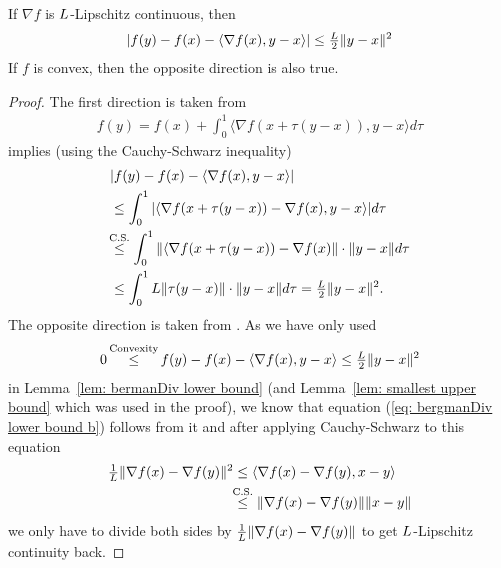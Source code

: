 \begin{lemma}
	\label{Appdx-lem: Lipschitz Gradient implies taylor inequality}
	If \(\nabla f\) is \(L\)-Lipschitz continuous, then
	\begin{align*}
		|f(y) - f(x) - \langle \nabla f(x), y-x\rangle | \le \tfrac{L}2 \|y-x\|^2
	\end{align*}
	If \(f\) is convex, then the opposite direction is also true.
\end{lemma}
\begin{proof}
	The first direction is taken from \textcite[Lemma
	1.2.3]{nesterovLecturesConvexOptimization2018}
 \begin{align*}
		f(y) = f(x) + \int_0^1\langle\nabla f(x+\tau(y-x)), y-x \rangle d\tau
	\end{align*}
	implies (using the  Cauchy-Schwarz inequality)
	\begin{align*}
		&| f(y) - f(x) - \langle \nabla f(x), y-x\rangle | \\
		&\le \int_0^1 | \langle\nabla f(x+\tau(y-x))-\nabla f(x), y-x\rangle | d\tau \\
		&\lxle{\text{C.S.}}
		\int_0^1 \|\langle\nabla f(x+\tau(y-x))-\nabla f(x)\| \cdot \|y-x\| d\tau\\
		&\le \int_0^1 \ubound \|\tau(y-x)\|\cdot\|y-x\| d\tau
		= \tfrac{\ubound}2 \|y-x\|^2.
		\qedhere
	\end{align*}
	The opposite direction is taken from \textcite[Lemma
	2.1.5]{nesterovLecturesConvexOptimization2018}.
	As we have only used
	\begin{align*}
		0\xle{\text{Convexity}} f(y) - f(x) - \langle \nabla f(x), y-x\rangle
		\le \tfrac{\ubound}2 \|y-x\|^2
	\end{align*}	
	in Lemma~\ref{lem: bermanDiv lower bound} (and Lemma~\ref{lem: smallest upper
	bound} which was used in the proof), we know that equation (\ref{eq:
	bergmanDiv lower bound b}) follows from it and after applying Cauchy-Schwarz
	to this equation
	\begin{align*}
		\tfrac{1}\ubound \|\nabla f(x)-\nabla f(y)\|^2
		&\le \langle \nabla f(x) - \nabla f(y), x-y\rangle \\
		&\lxle{\text{C.S.}} \|\nabla f(x) - \nabla f(y)\| \|x-y\|
	\end{align*}
	we only have to divide both sides by \(\tfrac{1}{L} \|\nabla f(x)-\nabla
	f(y)\|\) to get \(L\)-Lipschitz continuity back.
 \end{proof}


\endinput